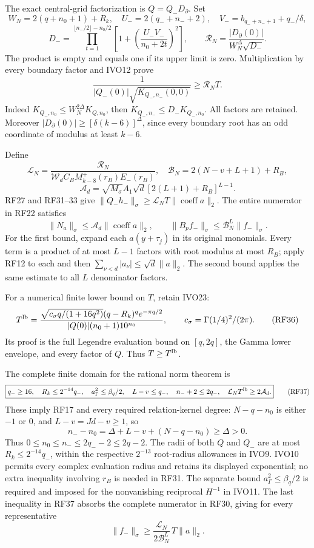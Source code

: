 \documentclass[11pt]{article}
\begin{document}
The exact central-grid factorization is \(Q=Q_-D_\partial\). Set \[
W_N=2(q+n_0+1)+R_k,\quad
U_-=2(q_-+n_-+2),\quad V_-=b_{q_-+n_-+1}+q_-/\delta,
\] \[
D_-=\prod_{t=1}^{\lfloor n_-/2\rfloor-n_0/2}
 \left[1+\left(\frac{U_-V_-}{n_0+2t}\right)^2\right],\qquad
\mathcal R_N=\frac{|D_\partial(0)|}{W_N^\Delta\sqrt{D_-}}.
\tag{RF32}
\] The product is empty and equals one if its upper limit is zero. Multiplication by every boundary factor and IVO12 prove \[
\frac1{|Q_-(0)|\sqrt{K_{Q_-,n_-}(0,0)}}\ge\mathcal R_N T.
\tag{RF33}
\] Indeed \(K_{Q_-,n_0}\le W_N^{2\Delta}K_{Q,n_0}\), then \(K_{Q_-,n_-}\le D_-K_{Q_-,n_0}\). All factors are retained. Moreover \(|D_\partial(0)|\ge[\delta(k-6)]^\Delta\), since every boundary root has an odd coordinate of modulus at least \(k-6\).

Define \[
\mathcal L_N=\frac{\mathcal R_N}
 {\mathcal W_dC_BM_{k-8}^+(r_B)E_-(r_B)},\quad
\mathcal B_N=2(N-v+L+1)+R_B,
\] \[
\mathcal A_d=\sqrt{M_\sigma}A_1\sqrt d
 [2(L+1)+R_B]^{L-1}.
\tag{RF34}
\] RF27 and RF31--33 give \(\|Q_-h_-\|_\sigma\ge\mathcal L_NT\|\operatorname{coeff}a\|_2\). The entire numerator in RF22 satisfies \[
\|N_a\|_\sigma\le\mathcal A_d\|\operatorname{coeff}a\|_2,\qquad
\|B_pf_-\|_\sigma\le\mathcal B_N^L\|f_-\|_\sigma.
\tag{RF35}
\] For the first bound, expand each \(a(y+\tau_j)\) in its original monomials. Every term is a product of at most \(L-1\) factors with root modulus at most \(R_B\); apply RF12 to each and then \(\sum_{\nu<d}|a_\nu|\le\sqrt d\|a\|_2\). The second bound applies the same estimate to all \(L\) denominator factors.

For a numerical finite lower bound on \(T\), retain IVO23: \[
T^{\rm lb}=
\frac{\sqrt{c_\sigma q/(1+16q^2)}
 (q-R_k)^q e^{-\pi q/2}}
 {|Q(0)|(n_0+1)10^{n_0}},
\qquad c_\sigma=\Gamma(1/4)^2/(2\pi).
\tag{RF36}
\] Its proof is the full Legendre evaluation bound on \([q,2q]\), the Gamma lower envelope, and every factor of \(Q\). Thus \(T\ge T^{\rm lb}\).

The complete finite domain for the rational norm theorem is \[
\boxed{
q_-\ge16,\quad R_k\le2^{-14}q_-,\quad
a_\Gamma^2\le\beta_q/2,\quad
L-v\le q_-,\quad n_-+2\le2q_-,\quad
\mathcal L_NT^{\rm lb}\ge2\mathcal A_d.}
\tag{RF37}
\] These imply RF17 and every required relation-kernel degree: \(N-q-n_0\) is either \(-1\) or \(0\), and \(L-v=Jd-v\ge1\), so \[
n_--n_0=\Delta+L-v+(N-q-n_0)\ge\Delta>0.
\] Thus \(0\le n_0\le n_-\le2q_--2\le2q-2\). The radii of both \(Q\) and \(Q_-\) are at most \(R_k\le2^{-14}q_-\), within the respective \(2^{-13}\) root-radius allowances in IVO9. IVO10 permits every complex evaluation radius and retains its displayed exponential; no extra inequality involving \(r_B\) is needed in RF31. The separate bound \(a_\Gamma^2\le\beta_q/2\) is required and imposed for the nonvanishing reciprocal \(H^{-1}\) in IVO11. The last inequality in RF37 absorbs the complete numerator in RF30, giving for every representative \[
\|f_-\|_\sigma\ge
\frac{\mathcal L_N}{2\mathcal B_N^L}\,T\|a\|_2.
\tag{RF38}
\]
\end{document}
